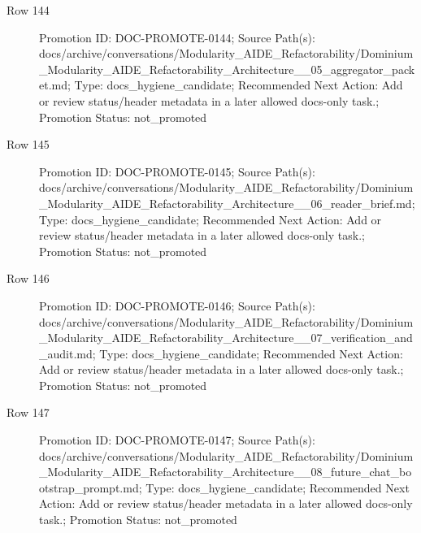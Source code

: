 \documentclass[9pt,a4paper,openany]{book}
\begin{document}
\begin{description}
\item[Row 144] Promotion ID: DOC-\allowbreak{}PROMOTE-\allowbreak{}0144; Source Path(s): docs/\allowbreak{}archive/\allowbreak{}conversations/\allowbreak{}Modularity\_\allowbreak{}AIDE\_\allowbreak{}Refactorability/\allowbreak{}Dominium\_\allowbreak{}Modularity\_\allowbreak{}AIDE\_\allowbreak{}Refactorability\_\allowbreak{}Architecture\_\allowbreak{}\_\allowbreak{}05\_\allowbreak{}aggregator\_\allowbreak{}packet.\allowbreak{}md; Type: docs\_\allowbreak{}hygiene\_\allowbreak{}candidate; Recommended Next Action: Add or review status/\allowbreak{}header metadata in a later allowed docs-\allowbreak{}only task.\allowbreak{}; Promotion Status: not\_\allowbreak{}promoted
\item[Row 145] Promotion ID: DOC-\allowbreak{}PROMOTE-\allowbreak{}0145; Source Path(s): docs/\allowbreak{}archive/\allowbreak{}conversations/\allowbreak{}Modularity\_\allowbreak{}AIDE\_\allowbreak{}Refactorability/\allowbreak{}Dominium\_\allowbreak{}Modularity\_\allowbreak{}AIDE\_\allowbreak{}Refactorability\_\allowbreak{}Architecture\_\allowbreak{}\_\allowbreak{}06\_\allowbreak{}reader\_\allowbreak{}brief.\allowbreak{}md; Type: docs\_\allowbreak{}hygiene\_\allowbreak{}candidate; Recommended Next Action: Add or review status/\allowbreak{}header metadata in a later allowed docs-\allowbreak{}only task.\allowbreak{}; Promotion Status: not\_\allowbreak{}promoted
\item[Row 146] Promotion ID: DOC-\allowbreak{}PROMOTE-\allowbreak{}0146; Source Path(s): docs/\allowbreak{}archive/\allowbreak{}conversations/\allowbreak{}Modularity\_\allowbreak{}AIDE\_\allowbreak{}Refactorability/\allowbreak{}Dominium\_\allowbreak{}Modularity\_\allowbreak{}AIDE\_\allowbreak{}Refactorability\_\allowbreak{}Architecture\_\allowbreak{}\_\allowbreak{}07\_\allowbreak{}verification\_\allowbreak{}and\_\allowbreak{}audit.\allowbreak{}md; Type: docs\_\allowbreak{}hygiene\_\allowbreak{}candidate; Recommended Next Action: Add or review status/\allowbreak{}header metadata in a later allowed docs-\allowbreak{}only task.\allowbreak{}; Promotion Status: not\_\allowbreak{}promoted
\item[Row 147] Promotion ID: DOC-\allowbreak{}PROMOTE-\allowbreak{}0147; Source Path(s): docs/\allowbreak{}archive/\allowbreak{}conversations/\allowbreak{}Modularity\_\allowbreak{}AIDE\_\allowbreak{}Refactorability/\allowbreak{}Dominium\_\allowbreak{}Modularity\_\allowbreak{}AIDE\_\allowbreak{}Refactorability\_\allowbreak{}Architecture\_\allowbreak{}\_\allowbreak{}08\_\allowbreak{}future\_\allowbreak{}chat\_\allowbreak{}bootstrap\_\allowbreak{}prompt.\allowbreak{}md; Type: docs\_\allowbreak{}hygiene\_\allowbreak{}candidate; Recommended Next Action: Add or review status/\allowbreak{}header metadata in a later allowed docs-\allowbreak{}only task.\allowbreak{}; Promotion Status: not\_\allowbreak{}promoted

\end{description}
\end{document}
